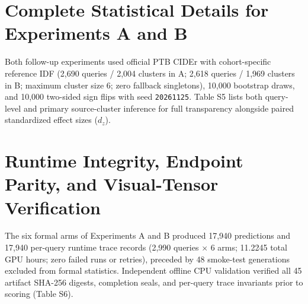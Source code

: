 \documentclass[11pt,a4paper]{article}
\begin{document}
\section{Complete Statistical Details for Experiments A and B}
Both follow-up experiments used official PTB CIDEr with cohort-specific reference IDF (2,690 queries / 2,004 clusters in A; 2,618 queries / 1,969 clusters in B; maximum cluster size 6; zero fallback singletons), 10,000 bootstrap draws, and 10,000 two-sided sign flips with seed \texttt{20261125}. Table S5 lists both query-level and primary source-cluster inference for full transparency alongside paired standardized effect sizes ($d_z$).

\begin{table}[t]
\centering
\footnotesize
\caption{Full query-level and source-cluster inference for all five prespecified contrasts in Experiments A and B (PTB CIDEr points). Primary inference uses source-cluster Holm adjustment.}
\label{tab:s5}
\end{table}

\section{Runtime Integrity, Endpoint Parity, and Visual-Tensor Verification}
The six formal arms of Experiments A and B produced 17,940 predictions and 17,940 per-query runtime trace records (2,990 queries $\times$ 6 arms; 11.2245 total GPU hours; zero failed runs or retries), preceded by 48 smoke-test generations excluded from formal statistics. Independent offline CPU validation verified all 45 artifact SHA-256 digests, completion seals, and per-query trace invariants prior to scoring (Table S6).
\end{document}

